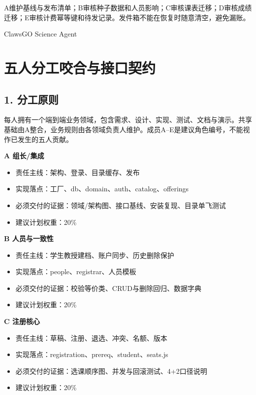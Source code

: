 \documentclass[UTF8,11pt,a4paper]{ctexart}
\providecommand{\tightlist}{\setlength{\itemsep}{0pt}\setlength{\parskip}{0pt}}
\begin{document}
A维护基线与发布清单；B审核种子数据和人员影响；C审核课表迁移；D审核成绩迁移；E审核计费幂等键和待发记录。发件箱不能在恢复时随意清空，避免漏账。

ClawsGO Science Agent

\clearpage
\hypertarget{ux4e94ux4ebaux5206ux5de5ux54acux5408ux4e0eux63a5ux53e3ux5951ux7ea6}{%
\section{五人分工咬合与接口契约}\label{ux4e94ux4ebaux5206ux5de5ux54acux5408ux4e0eux63a5ux53e3ux5951ux7ea6}}

\hypertarget{1-ux5206ux5de5ux539fux5219}{%
\subsection{1. 分工原则}\label{1-ux5206ux5de5ux539fux5219}}

每人拥有一个端到端业务领域，包含需求、设计、实现、测试、文档与演示。共享基础由A整合，业务规则由各领域负责人维护。成员A--E是建议角色编号，不能视作已发生的五人贡献。

\textbf{A 组长/集成}

\begin{itemize}
\tightlist
\item
  责任主线：架构、登录、目录缓存、发布
\item
  实现落点：工厂、db、domain、auth、catalog、offerings
\item
  必须交付的证据：领域/架构图、接口基线、安装复现、目录单飞测试
\item
  建议计划权重：20\%
\end{itemize}

\textbf{B 人员与一致性}

\begin{itemize}
\tightlist
\item
  责任主线：学生教授建档、账户同步、历史删除保护
\item
  实现落点：people、registrar、人员模板
\item
  必须交付的证据：校验等价类、CRUD与删除回归、数据字典
\item
  建议计划权重：20\%
\end{itemize}

\textbf{C 注册核心}

\begin{itemize}
\tightlist
\item
  责任主线：草稿、注册、退选、冲突、名额、版本
\item
  实现落点：registration、prereq、student、seats.js
\item
  必须交付的证据：选课顺序图、并发与回滚测试、4+2口径说明
\item
  建议计划权重：20\%
\end{itemize}
\end{document}
